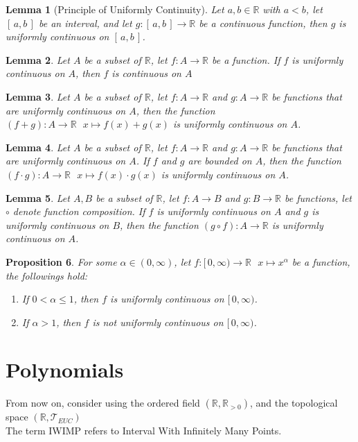 \documentclass[11pt]{article}
\theoremstyle{break}
\theoremstyle{break}
\newtheorem{lem}{Lemma}[thm]
\newtheorem{prop}[lem]{Proposition}
\newcommand{\R}{\mathbb{R}}
\newcommand{\T}{\mathcal{T}}
\begin{document}
	\begin{lem}[Principle of Uniformly Continuity]
		Let $a,b \in \R$ with $a<b$, let $[\,a,b\,]$ be an interval, and let $g:[\,a,b\,] \to \R$ be a continuous function, then $g$ is uniformly continuous on $[\,a,b\,]$.
	\end{lem}
	
	\begin{lem}
		Let $A$ be a subset of $\R$, let $f:A \to \R$ be a function. If $f$ is uniformly continuous on $A$, then $f$ is continuous on $A$
	\end{lem}
	
	\begin{lem}
		Let $A$ be a subset of $\R$, let $f:A \to \R$ and $g:A \to \R$ be functions that are uniformly continuous on $A$, then the function $(f+g):A \to \R \ \ \ x \mapsto f(x)+g(x)$ is uniformly continuous on $A$.
	\end{lem}
	
	\begin{lem}
		Let $A$ be a subset of $\R$, let $f:A \to \R$ and $g:A \to \R$ be functions that are uniformly continuous on $A$. If $f$ and $g$ are bounded on $A$, then the function $(f \cdot g):A \to \R \ \ \ x \mapsto f(x)\cdot g(x)$ is uniformly continuous on $A$.
	\end{lem}
	
	\begin{lem}
		Let $A,B$ be a subset of $\R$, let $f:A \to B$ and $g:B \to \R$ be functions, let $\circ$ denote function composition. If $f$ is uniformly continuous on $A$ and $g$ is uniformly continuous on $B$, then the function $(g \circ f):A \to \R$ is uniformly continuous on $A$.
	\end{lem}
		
		
	\begin{prop}	
		For some $\alpha \in (0,\infty)$, let $f:[\,0,\infty) \to \R \ \ \ x \mapsto x^{\alpha}$ be a function, the followings hold:
		\begin{enumerate}[topsep=3pt,itemsep=-1ex,partopsep=1ex,parsep=1ex]
			\item If $0<\alpha\leq 1$, then $f$ is uniformly continuous on $[\,0,\infty)$.
			\item If $\alpha >1$, then $f$ is not uniformly continuous on $[\,0,\infty)$.
		\end{enumerate}		 
	\end{prop}
	
\hfill\break
\hfill\break
\hfill\break
\hfill\break
\hfill\break
\section{\color{red} Polynomials}
	\color{red} \noindent From now on, consider using the ordered field $(\R,\R_{>0})$, and the topological space $(\R, \T_{EUC})$\\ The term IWIMP refers to Interval With Infinitely Many Points. \color{black}
		
\end{document}
